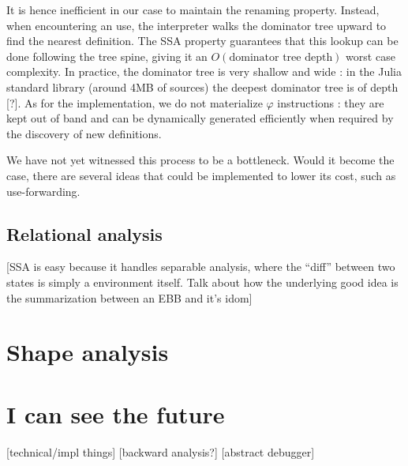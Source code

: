 \documentclass[11pt]{article}
\renewcommand{\phi}{\varphi}
\begin{document}
It is hence inefficient in our case to maintain the renaming property. Instead, when encountering an use, the interpreter walks the dominator tree upward to find the nearest definition. The SSA property guarantees that this lookup can be done following the tree spine, giving it an $O(\text{dominator tree depth})$ worst case complexity. In practice, the dominator tree is very shallow and wide : in the Julia standard library (around 4MB of sources) the deepest dominator tree is of depth [?]. As for the implementation, we do not materialize $\phi$ instructions : they are kept out of band and can be dynamically generated efficiently when required by the discovery of new definitions.

We have not yet witnessed this process to be a bottleneck. Would it become the case, there are several ideas that could be implemented to lower its cost, such as use-forwarding.


\subsection*{Relational analysis}

[SSA is easy because it handles separable analysis, where the ``diff'' between two states is simply a environment itself. Talk about how the underlying good idea is the summarization between an EBB and it's idom]

\section*{Shape analysis}

\section*{I can see the future}

[technical/impl things] [backward analysis?] [abstract debugger]
\end{document}
